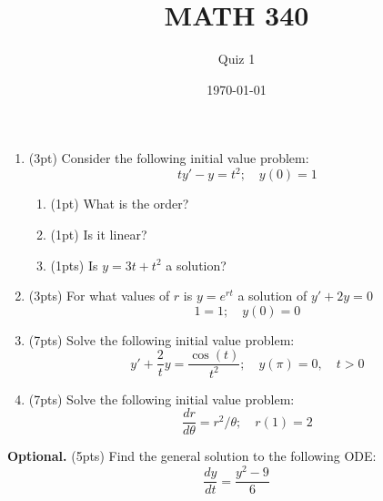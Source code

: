 \documentclass{article}
\begin{document}
\title{MATH 340}
\author{Quiz 1}
\date{\today}
\maketitle

\begin{enumerate}
	\item (3pt) Consider the following initial value problem:
	\[ty'-y=t^2;\quad y(0)=1\]
\begin{enumerate}
	\item (1pt) What is the order?
	\item (1pt) Is it linear?
	\item (1pts) Is $y=3t+t^2$ a solution?
\end{enumerate}
\item (3pts) For what values of $r$ is $y=e^{rt}$ a solution of $y'+2y=0$
	\[1=1;\quad y(0)=0\]
\item (7pts) Solve the following initial value problem:
	\[y'+\frac{2}{t}y=\frac{\cos(t)}{t^2};\quad y(\pi)=0,\quad t>0\]
\item (7pts) Solve the following initial value problem:
	\[\frac{dr}{d\theta}=r^2/\theta;\quad r(1)=2\]
\end{enumerate}
\textbf{Optional.} (5pts) Find the general solution to the following ODE:
	\[\frac{dy}{dt}=\frac{y^2-9}{6}\]
\end{document}
